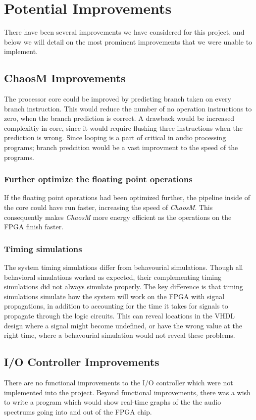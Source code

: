 \section{Potential Improvements}

There have been several improvements we have considered for this project, and
below we will detail on the most prominent improvements that we were unable to
implement.

\subsection{ChaosM Improvements}

The processor core could be improved by predicting branch taken on every branch
instruction. This would reduce the number of no operation instructions to zero,
when the branch prediction is correct. A drawback would be increased complexitiy
in core, since it would require flushing three instructions when the prediction
is wrong. Since looping is a part of critical in audio processing programs;
branch predcition would be a vast improvment to the speed of the programs.
\subsubsection{Further optimize the floating point operations}

If the floating point operations had been optimized further, the pipeline inside
of the core could have run faster, increasing the speed of \textit{ChaosM}. This
consequently makes \textit{ChaosM} more energy efficient as the operations on
the FPGA finish faster.

\subsubsection{Timing simulations}
The system timing simulations differ from behavourial simulations. Though all
behavioral simulations worked as expected, their complementing timing
simulations did not always simulate properly. The key difference is that timing
simulations simulate how the system will work on the FPGA with signal
propagations, in addition to accounting for the time it takes for signals to
propagate through the logic circuits. This can reveal locations in the VHDL
design where a signal might become undefined, or have the wrong value at the
right time, where a behavourial simulation would not reveal these problems.

\subsection{I/O Controller Improvements}
There are no functional improvements to the I/O controller which were not
implemented into the project. Beyond functional improvements, there was a
wish to write a program which would show real-time graphs of the the audio
spectrums going into and out of the FPGA chip.

